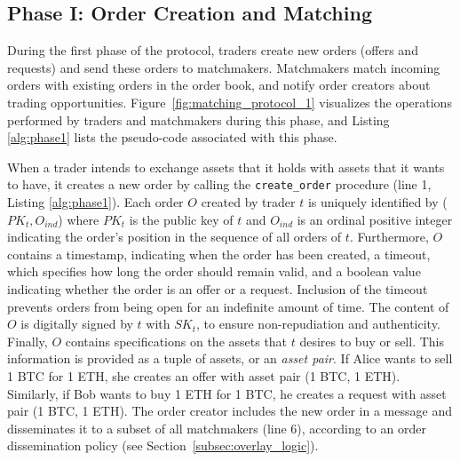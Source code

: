 \subsection{Phase I: Order Creation and Matching} \label{sec:phase_matching}

During the first phase of the \ModelName{} protocol, traders create new orders (offers and requests) and send these orders to matchmakers.
Matchmakers match incoming orders with existing orders in the order book, and notify order creators about trading opportunities.
Figure~\ref{fig:matching_protocol_1} visualizes the operations performed by traders and matchmakers during this phase, and Listing \ref{alg:phase1} lists the pseudo-code associated with this phase.

When a trader intends to exchange assets that it holds with assets that it wants to have, it creates a new order by calling the \texttt{create\_order} procedure (line 1, Listing \ref{alg:phase1}).
Each order $ O $ created by trader $ t $ is uniquely identified by ($ PK_t, O_{ind} $) where $ PK_t $ is the public key of $ t $ and $ O_{ind} $ is an ordinal positive integer indicating the order's position in the sequence of all orders of $ t $.
Furthermore, $ O $ contains a timestamp, indicating when the order has been created, a timeout, which specifies how long the order should remain valid, and a boolean value indicating whether the order is an offer or a request.
Inclusion of the timeout prevents orders from being open for an indefinite amount of time.
The content of $ O $ is digitally signed by $ t $ with $ SK_t $, to ensure non-repudiation and authenticity.
Finally, $ O $ contains specifications on the assets that $ t $ desires to buy or sell.
This information is provided as a tuple of assets, or an \emph{asset pair}.
If Alice wants to sell 1 BTC for 1 ETH, she creates an offer with asset pair (1 BTC, 1 ETH).
Similarly, if Bob wants to buy 1 ETH for 1 BTC, he creates a request with asset pair (1 BTC, 1 ETH).
The order creator includes the new order in a \MsgOrder{} message and disseminates it to a subset of all matchmakers (line 6), according to an order dissemination policy (see Section~\ref{subsec:overlay_logic}).

% 

